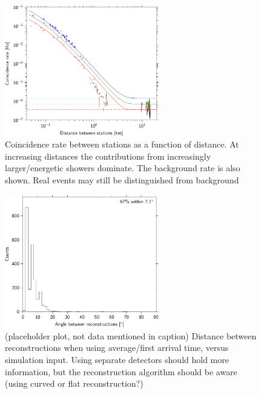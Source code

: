 \begin{figure}
    \centering
    \includegraphics[width=0.6\textwidth]
                    {plots/experiment/distance_v_coincidence_rate}
    \caption{Coincidence rate between stations as a function of distance. At increasing distances the contributions from increasingly larger/energetic showers dominate. The background rate is also shown. Real events may still be distinguished from background}
    \label{fig:distance_v_coincidence_rate}
\end{figure}


\begin{figure}
    \centering
    \includegraphics[width=0.6\textwidth]
                    {plots/experiment/angle_between_501_minn16_510}
    \caption{(placeholder plot, not data mentioned in caption) Distance between reconstructions when using average/first arrival time, versus simulation input. Using separate detectors should hold more information, but the reconstruction algorithm should be aware (using curved or flat reconstruction?)}
    \label{fig:angle_between_501_minn16_510}
\end{figure}


